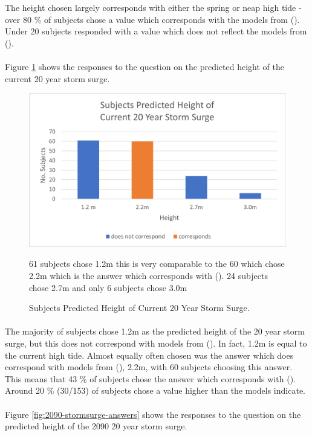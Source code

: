 The height chosen largely corresponds with either the spring or neap high tide - over 80 \% of subjects chose a value which corresponds with the models from (\cite{kartverket_se_2020}). Under 20 subjects responded with a value which does not reflect the models from (\cite{kartverket_se_2021}). 
\paragraph{}
Figure \ref{fig:2022-stormsurge-answers} shows the responses to the question on the predicted height of the current 20 year storm surge. 
\begin{figure}[H]
    \centering
    \includegraphics{fig_results/2022-20yrss-answer.png}
    \caption{Subjects Predicted Height of Current 20 Year Storm Surge.}{ 61 subjects chose 1.2m this is very comparable to the 60 which chose 2.2m which is the answer which corresponds with (\cite{kartverket_se_2021}). 24 subjects chose 2.7m and only 6 subjects chose 3.0m}
    \label{fig:2022-stormsurge-answers}
\end{figure}
\paragraph{}
The majority of subjects chose 1.2m as the predicted height of the 20 year storm surge, but this does not correspond with models from (\cite{kartverket_se_2021}). In fact, 1.2m is equal to the current high tide. Almost equally often chosen was the answer which does correspond with models from (\cite{kartverket_se_2021}), 2.2m, with 60 subjects choosing this answer. This means that 43 \% of subjects chose the answer which corresponds with (\cite{kartverket_se_2021}). Around 20 \% (30/153) of subjects chose a value higher than the models indicate.
\paragraph{}
Figure \ref{fig:2090-stormsurge-answers} shows the responses to the question on the predicted height of the 2090 20 year storm surge.

